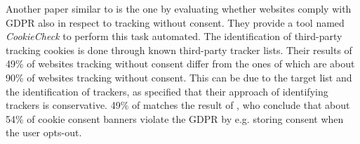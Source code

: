 Another paper similar to  is the one by  evaluating whether websites comply
with GDPR also in respect to tracking without consent. They provide a tool named \emph{CookieCheck} to perform this task
automated. The identification of third-party tracking cookies is done through known third-party tracker lists. Their
results of 49\% of websites tracking without consent differ from the ones of \citeauthor{sanchez2019can} which are about
90\% of websites tracking without consent. This can be due to the target list and the identification of trackers,
as \citeauthor{sanchez2019can} specified that their approach of identifying trackers is conservative. 49\% of
\citeauthor{trevisan20194} matches the result of , who conclude that about 54\% of cookie consent
banners violate the GDPR by e.g. storing consent when the user opts-out.


